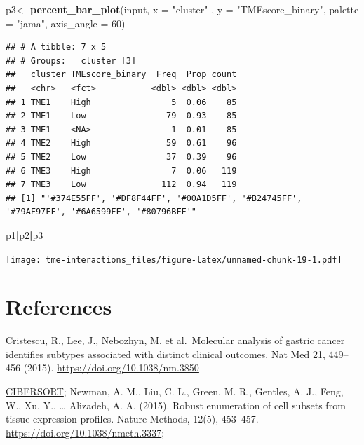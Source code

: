 \documentclass[
  12pt,
]{book}
\newenvironment{Shaded}{\begin{snugshade}}{\end{snugshade}}
\newcommand{\AttributeTok}[1]{\textcolor[rgb]{0.13,0.29,0.53}{#1}}
\newcommand{\DecValTok}[1]{\textcolor[rgb]{0.00,0.00,0.81}{#1}}
\newcommand{\FunctionTok}[1]{\textcolor[rgb]{0.13,0.29,0.53}{\textbf{#1}}}
\newcommand{\NormalTok}[1]{#1}
\newcommand{\OtherTok}[1]{\textcolor[rgb]{0.56,0.35,0.01}{#1}}
\newcommand{\SpecialCharTok}[1]{\textcolor[rgb]{0.81,0.36,0.00}{\textbf{#1}}}
\newcommand{\StringTok}[1]{\textcolor[rgb]{0.31,0.60,0.02}{#1}}
\begin{document}
\begin{Shaded}
\begin{Highlighting}[]
\NormalTok{p3}\OtherTok{\textless{}{-}} \FunctionTok{percent\_bar\_plot}\NormalTok{(input, }\AttributeTok{x =} \StringTok{"cluster"}\NormalTok{ , }\AttributeTok{y =} \StringTok{"TMEscore\_binary"}\NormalTok{, }\AttributeTok{palette =} \StringTok{"jama"}\NormalTok{, }\AttributeTok{axis\_angle =} \DecValTok{60}\NormalTok{)}
\end{Highlighting}
\end{Shaded}

\begin{verbatim}
## # A tibble: 7 x 5
## # Groups:   cluster [3]
##   cluster TMEscore_binary  Freq  Prop count
##   <chr>   <fct>           <dbl> <dbl> <dbl>
## 1 TME1    High                5  0.06    85
## 2 TME1    Low                79  0.93    85
## 3 TME1    <NA>                1  0.01    85
## 4 TME2    High               59  0.61    96
## 5 TME2    Low                37  0.39    96
## 6 TME3    High                7  0.06   119
## 7 TME3    Low               112  0.94   119
## [1] "'#374E55FF', '#DF8F44FF', '#00A1D5FF', '#B24745FF', '#79AF97FF', '#6A6599FF', '#80796BFF'"
\end{verbatim}

\begin{Shaded}
\begin{Highlighting}[]
\NormalTok{p1}\SpecialCharTok{|}\NormalTok{p2}\SpecialCharTok{|}\NormalTok{p3}
\end{Highlighting}
\end{Shaded}

\texttt{[image: tme-interactions\_files/figure-latex/unnamed-chunk-19-1.pdf]}

\hypertarget{references-3}{%
\section{References}\label{references-3}}

Cristescu, R., Lee, J., Nebozhyn, M. et al.~Molecular analysis of gastric cancer identifies subtypes associated with distinct clinical outcomes. Nat Med 21, 449--456 (2015). \url{https://doi.org/10.1038/nm.3850}

\href{https://cibersort.stanford.edu/}{CIBERSORT}; Newman, A. M., Liu, C. L., Green, M. R., Gentles, A. J., Feng, W., Xu, Y., \ldots{} Alizadeh, A. A. (2015). Robust enumeration of cell subsets from tissue expression profiles. Nature Methods, 12(5), 453--457. \url{https://doi.org/10.1038/nmeth.3337};
\end{document}
